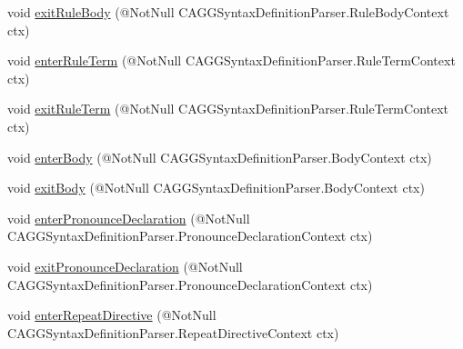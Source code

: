 \begin{DoxyCompactItemize}
\item 
void \hyperlink{classit_1_1emarolab_1_1cagg_1_1core_1_1language_1_1parser_1_1ANTLRInterface_1_1ANTLRGenerated_1_1a45b55289931e185944c10a916c8cdd_afef9021edef06f1a29a1641e756f5cf9}{exit\-Rule\-Body} (@Not\-Null C\-A\-G\-G\-Syntax\-Definition\-Parser.\-Rule\-Body\-Context ctx)
\item 
void \hyperlink{classit_1_1emarolab_1_1cagg_1_1core_1_1language_1_1parser_1_1ANTLRInterface_1_1ANTLRGenerated_1_1a45b55289931e185944c10a916c8cdd_a427165610b1bc9e719db8e1db882d469}{enter\-Rule\-Term} (@Not\-Null C\-A\-G\-G\-Syntax\-Definition\-Parser.\-Rule\-Term\-Context ctx)
\item 
void \hyperlink{classit_1_1emarolab_1_1cagg_1_1core_1_1language_1_1parser_1_1ANTLRInterface_1_1ANTLRGenerated_1_1a45b55289931e185944c10a916c8cdd_aca22e396d438bf2e273db4791f2e78cb}{exit\-Rule\-Term} (@Not\-Null C\-A\-G\-G\-Syntax\-Definition\-Parser.\-Rule\-Term\-Context ctx)
\item 
void \hyperlink{classit_1_1emarolab_1_1cagg_1_1core_1_1language_1_1parser_1_1ANTLRInterface_1_1ANTLRGenerated_1_1a45b55289931e185944c10a916c8cdd_a113f818ea564678f4d3050f0f46a0cad}{enter\-Body} (@Not\-Null C\-A\-G\-G\-Syntax\-Definition\-Parser.\-Body\-Context ctx)
\item 
void \hyperlink{classit_1_1emarolab_1_1cagg_1_1core_1_1language_1_1parser_1_1ANTLRInterface_1_1ANTLRGenerated_1_1a45b55289931e185944c10a916c8cdd_a8246e1e1e685d4ea7705d0be2afdfbd3}{exit\-Body} (@Not\-Null C\-A\-G\-G\-Syntax\-Definition\-Parser.\-Body\-Context ctx)
\item 
void \hyperlink{classit_1_1emarolab_1_1cagg_1_1core_1_1language_1_1parser_1_1ANTLRInterface_1_1ANTLRGenerated_1_1a45b55289931e185944c10a916c8cdd_ae2073415028cef2ac3f53e2a2909e13d}{enter\-Pronounce\-Declaration} (@Not\-Null C\-A\-G\-G\-Syntax\-Definition\-Parser.\-Pronounce\-Declaration\-Context ctx)
\item 
void \hyperlink{classit_1_1emarolab_1_1cagg_1_1core_1_1language_1_1parser_1_1ANTLRInterface_1_1ANTLRGenerated_1_1a45b55289931e185944c10a916c8cdd_ac08e1c9e31cb5e5d720426ed295feb01}{exit\-Pronounce\-Declaration} (@Not\-Null C\-A\-G\-G\-Syntax\-Definition\-Parser.\-Pronounce\-Declaration\-Context ctx)
\item 
void \hyperlink{classit_1_1emarolab_1_1cagg_1_1core_1_1language_1_1parser_1_1ANTLRInterface_1_1ANTLRGenerated_1_1a45b55289931e185944c10a916c8cdd_a155318ef10fda02f783c60f447959688}{enter\-Repeat\-Directive} (@Not\-Null C\-A\-G\-G\-Syntax\-Definition\-Parser.\-Repeat\-Directive\-Context ctx)

\end{DoxyCompactItemize}
